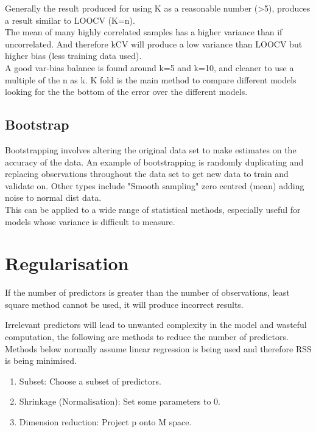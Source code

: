 \documentclass[11pt]{scrartcl} %
\begin{document}
Generally the result produced for using K as a reasonable number (>5), produces a result similar to
LOOCV (K=n).\\

The mean of many highly correlated samples has a higher variance than if uncorrelated. And therefore
kCV will produce a low variance than LOOCV but higher bias (less training data used).\\

A good var-bias balance is found around k=5 and k=10, and cleaner to use a multiple of the n as k.
K fold is the main method to compare different models looking for the the bottom of the error over the
different models.

\subsection{Bootstrap}

Bootstrapping involves altering the original data set to make estimates on the accuracy of the data.
An example of bootstrapping is randomly duplicating and replacing observations throughout the data set
to get new data to train and validate on. Other types include "Smooth sampling" zero centred (mean) 
adding noise to normal dist data. \\

This can be applied to a wide range of statistical methods, especially useful for models whose variance
is difficult to measure.

\section{Regularisation}

If the number of predictors is greater than the number of observations, least square method cannot be 
used, it will produce incorrect results.

Irrelevant predictors will lead to unwanted complexity in the model and wasteful computation, the following are methods
to reduce the number of predictors.\\

Methods below normally assume linear regression is being used and therefore RSS is being minimised.

\begin{enumerate}
	\item Subset: Choose a subset of predictors.
	\item Shrinkage (Normalisation): Set some parameters to 0.
	\item Dimension reduction: Project p onto M space.
\end{enumerate}
\end{document}
